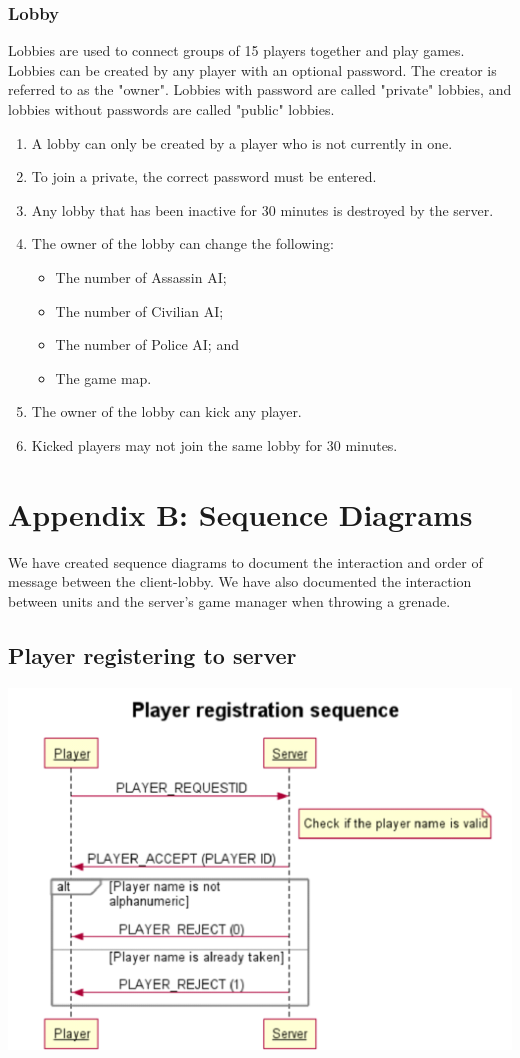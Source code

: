 \documentclass[12pt]{article}
\newenvironment{req} {\begin{enumerate}[leftmargin=2.5cm, label = \textbf{REQ \arabic{subsection}.\arabic{subsubsection}.\arabic*:}]} {\end{enumerate}}
\begin{document}
\subsubsection{Lobby}
Lobbies are used to connect groups of 15 players together and play games. Lobbies can be created by any player with an optional password. The creator is referred to as the "owner". Lobbies with password are called "private" lobbies, and lobbies without passwords are called "public" lobbies.
\begin{req}
\item A lobby can only be created by a player who is not currently in one.
\item To join a private, the correct password must be entered.
\item Any lobby that has been inactive for 30 minutes is destroyed by the server.
\item The owner of the lobby can change the following:
\begin{itemize}
\item The number of Assassin AI;
\item The number of Civilian AI;
\item The number of Police AI; and
\item The game map.
\end{itemize}
\item The owner of the lobby can kick any player.
\item Kicked players may not join the same lobby for 30 minutes.
\end{req}
\newpage
\section{Appendix B: Sequence Diagrams}
We have created sequence diagrams to document the interaction and order of message between the client-lobby. We have also documented the interaction between units and the server's game manager when throwing a grenade.
\subsection*{Player registering to server}
\includegraphics[scale=0.5]{registration-sequence}
\end{document}
